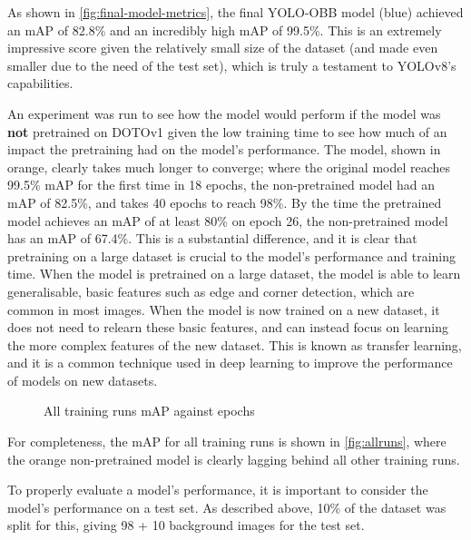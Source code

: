As shown in \autoref{fig:final-model-metrics}, the final YOLO-OBB model (blue) achieved an mAP of 82.8\% and an incredibly high mAP of 99.5\%. This is an extremely impressive score given the relatively small size of the dataset (and made even smaller due to the need of the test set), which is truly a testament to YOLOv8's capabilities.

An experiment was run to see how the model would perform if the model was \textbf{not} pretrained on DOTOv1 \cite{9560031} given the low training time to see how much of an impact the pretraining had on the model's performance. The model, shown in orange, clearly takes much longer to converge; where the original model reaches 99.5\% mAP for the first time in 18 epochs, the non-pretrained model had an mAP of 82.5\%, and takes 40 epochs to reach 98\%. By the time the pretrained model achieves an mAP of at least 80\% on epoch 26, the non-pretrained model has an mAP of 67.4\%. This is a substantial difference, and it is clear that pretraining on a large dataset is crucial to the model's performance and training time. When the model is pretrained on a large dataset, the model is able to learn generalisable, basic features such as edge and corner detection, which are common in most images. When the model is now trained on a new dataset, it does not need to relearn these basic features, and can instead focus on learning the more complex features of the new dataset. This is known as transfer learning, and it is a common technique used in deep learning to improve the performance of models on new datasets.

\begin{figure}[H]
  \centering
  
  \caption{All training runs mAP against epochs}
  \label{fig:allruns}
\end{figure}

For completeness, the mAP for all training runs is shown in \autoref{fig:allruns}, where the orange non-pretrained model is clearly lagging behind all other training runs.

To properly evaluate a model's performance, it is important to consider the model's performance on a test set. As described above, 10\% of the dataset was split for this, giving 98 + 10 background images for the test set.

